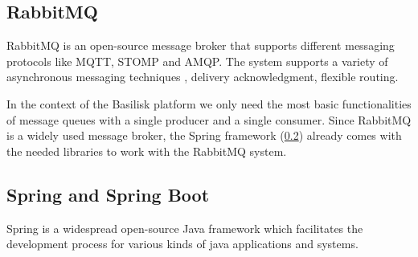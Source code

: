 \subsection{RabbitMQ}
\label{sec:rabbitmq}
RabbitMQ is an open-source message broker that supports different messaging protocols like MQTT, STOMP and AMQP.
The system supports a variety of asynchronous messaging techniques \eg, delivery acknowledgment, flexible routing\cite{RabbitMQWebsiteHttps}.

In the context of the Basilisk platform we only need the most basic functionalities of message queues with a single producer and a single consumer.
Since RabbitMQ is a widely used message broker, the Spring framework (\ref{sec:spring}) already comes with the needed libraries to work with the RabbitMQ system.


\subsection{Spring and Spring Boot}
\label{sec:spring}
Spring is a widespread open-source Java framework which facilitates the development process for various kinds of java applications and systems.

